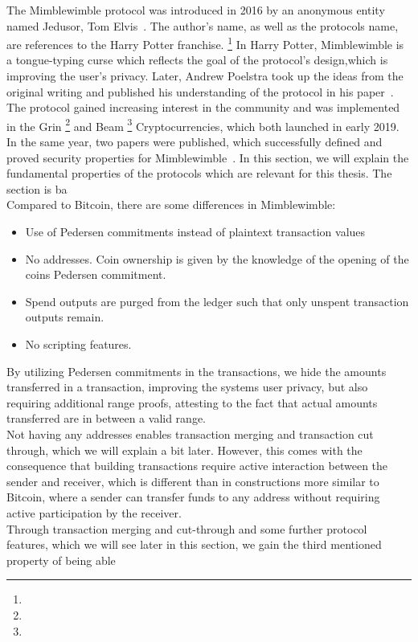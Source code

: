The Mimblewimble protocol was introduced in 2016 by an anonymous entity named Jedusor, Tom Elvis~\cite{jedusor2016mimblewimble}. The author's name, as well as the protocols name,
are references to the Harry Potter franchise. \footnote{\urlharrypotter} In Harry Potter, Mimblewimble is a tongue-typing curse which reflects
the goal of the protocol's design,which is improving the user's privacy.
Later, Andrew Poelstra took up the ideas from the original writing and published his understanding of the protocol in his paper~\cite{poelstra2016mimblewimble}.
The protocol gained increasing interest in the community and was implemented in the Grin \footnote{\urlgrin} and Beam \footnote{\urlbeam} Cryptocurrencies, which both launched in early 2019. In the same year,
two papers were published, which successfully defined and proved security properties for Mimblewimble~\cite{fuchsbauer2019aggregate,betarte2019towards}. In this section, we will explain the fundamental properties of the
protocols which are relevant for this thesis. The section is ba
\\
Compared to Bitcoin, there are some differences in Mimblewimble:
\begin{itemize}
    \item Use of Pedersen commitments instead of plaintext transaction values
    \item No addresses. Coin ownership is given by the knowledge of the opening of the coins Pedersen commitment.
    \item Spend outputs are purged from the ledger such that only unspent transaction outputs remain.
    \item No scripting features.
\end{itemize}
By utilizing Pedersen commitments in the transactions, we hide the amounts transferred in a transaction,
improving the systems user privacy, but also requiring additional range proofs, attesting to the fact that actual amounts transferred are in between a valid range.\\
Not having any addresses enables transaction merging and transaction cut through, which we will explain a bit later.
However, this comes with the consequence that building transactions require active interaction between the sender and receiver,
which is different than in constructions more similar to Bitcoin, where a sender can transfer funds to any address without requiring active participation by the receiver.\\
Through transaction merging and cut-through and some further protocol features, which we will see later in this section, we gain the third mentioned property of being able
